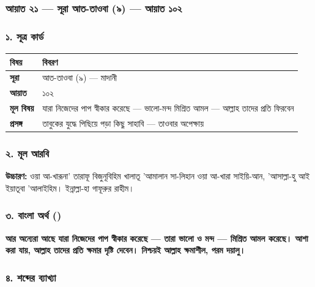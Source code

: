 \subsubsection*{আয়াত ২১ — সূরা আত-তাওবা (৯) — আয়াত ১০২}

\subsubsection*{১. সূত্র কার্ড}

\begin{table}[h]\centering\small
\begin{tabular}{ll}
বিষয় & বিবরণ \\
\hline
\textbf{সূরা} & আত-তাওবা (৯) — মাদানী \\
\textbf{আয়াত} & ১০২ \\
\textbf{মূল বিষয়} & যারা নিজেদের পাপ স্বীকার করেছে — ভালো-মন্দ মিশ্রিত আমল — আল্লাহ তাদের প্রতি ফিরবেন \\
\textbf{প্রসঙ্গ} & তাবুকের যুদ্ধে পিছিয়ে পড়া কিছু সাহাবি — তাওবার অপেক্ষায় \\
\hline
\end{tabular}
\end{table}

\subsubsection*{২. মূল আরবি}

\begin{center}\end{center}
\textbf{উচ্চারণ:} ওয়া আ-খারূনা' তারাফূ বিজুনূবিহিম খালাতূ 'আমালান সা-লিহান ওয়া আ-খারা সাইয়ি-আন, 'আসাল্লা-হু আই ইয়াতূবা 'আলাইহিম। ইন্নাল্লা-হা গাফূরুর রাহীম।

\subsubsection*{৩. বাংলা অর্থ ()}

\textbf{আর অন্যেরা আছে যারা নিজেদের পাপ স্বীকার করেছে — তারা ভালো ও মন্দ — মিশ্রিত আমল করেছে। আশা করা যায়, আল্লাহ তাদের প্রতি ক্ষমার দৃষ্টি দেবেন। নিশ্চয়ই আল্লাহ ক্ষমাশীল, পরম দয়ালু।}

\subsubsection*{৪. শব্দের ব্যাখ্যা}

